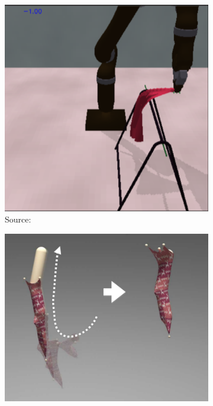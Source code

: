 \documentclass[\home/main.tex]{subfiles}
\begin{document}
\begin{figure}[htpb]{}
    \centering
    \begin{subfigure}[b]{0.80\textwidth}
        \includegraphics[width=\linewidth,keepaspectratio]{figures/sim_constraints}
        \caption{Source: \autocite{Matas2018}}
        \label{fig:towards_simulation_constraints}
    \end{subfigure}
    \par\bigskip %
    \begin{subfigure}[b]{0.80\textwidth}
        \includegraphics[width=\linewidth,keepaspectratio]{figures/sim_contacts}

\end{subfigure}
\end{figure}
\end{document}

